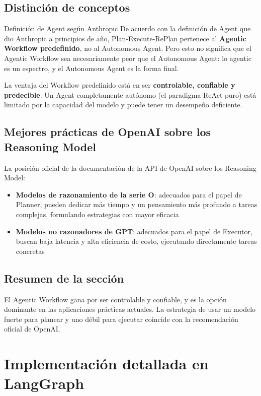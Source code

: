 \documentclass[a4paper]{article}
\begin{document}
\subsection{Distinción de conceptos}

\begin{knowledgebox}{Definición de Agent según Anthropic}
De acuerdo con la definición de Agent que dio Anthropic a principios de año, Plan-Execute-RePlan pertenece al \textbf{Agentic Workflow predefinido}, no al Autonomous Agent. Pero esto no significa que el Agentic Workflow sea necesariamente peor que el Autonomous Agent: lo agentic es un espectro, y el Autonomous Agent es la forma final.
\end{knowledgebox}

La ventaja del Workflow predefinido está en ser \textbf{controlable, confiable y predecible}. Un Agent completamente autónomo (el paradigma ReAct puro) está limitado por la capacidad del modelo y puede tener un desempeño deficiente.

\subsection{Mejores prácticas de OpenAI sobre los Reasoning Model}

La posición oficial de la documentación de la API de OpenAI sobre los Reasoning Model:
\begin{itemize}
    \item \textbf{Modelos de razonamiento de la serie O}: adecuados para el papel de Planner, pueden dedicar más tiempo y un pensamiento más profundo a tareas complejas, formulando estrategias con mayor eficacia
    \item \textbf{Modelos no razonadores de GPT}: adecuados para el papel de Executor, buscan baja latencia y alta eficiencia de costo, ejecutando directamente tareas concretas
\end{itemize}

\subsection{Resumen de la sección}

El Agentic Workflow gana por ser controlable y confiable, y es la opción dominante en las aplicaciones prácticas actuales. La estrategia de usar un modelo fuerte para planear y uno débil para ejecutar coincide con la recomendación oficial de OpenAI.

\section{Implementación detallada en LangGraph}
\end{document}

